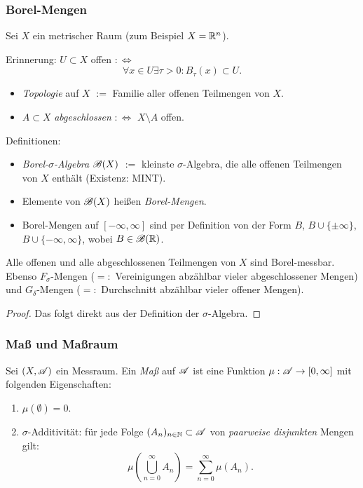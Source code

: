 \documentclass[
 a4paper,
 12pt,
 parskip=half
 ]{scrartcl}
\theoremstyle{plain}
\theoremstyle{definition}
\numberwithin{equation}{section}
\begin{document}
\subsubsection{Borel-Mengen}
Sei $X$ ein metrischer Raum (zum Beispiel $X = \mathbb{R}^n$). 

Erinnerung: $U \subset X$ offen $:\Leftrightarrow$
\[ \forall x \in U \exists \tau > 0: B_\tau(x) \subset U. \]
\begin{itemize}
 \item \emph{Topologie} auf $X$ $:=$ Familie aller offenen Teilmengen von $X$.
 \item $A \subset X$ \emph{abgeschlossen} $:\Leftrightarrow$ $X \setminus A$ offen.
\end{itemize}

Definitionen:
\begin{itemize}
 \item \emph{Borel-$\sigma$-Algebra} $\mathscr{B}(X)$ $:=$ kleinste $\sigma$-Algebra, die alle offenen Teilmengen von $X$ enthält (Existenz: MINT).
 \item Elemente von $\mathscr{B}(X)$ heißen \emph{Borel-Mengen}.
 \item Borel-Mengen auf $[-\infty,\infty]$ sind per Definition von der Form $B$, $B \cup \{ \pm \infty \}$, $B \cup \{ -\infty, \infty \}$, wobei $B \in \mathscr{B}(\mathbb{R})$.
\end{itemize}

\begin{bem}
 Alle offenen und alle abgeschlossenen Teilmengen von $X$ sind Borel-messbar. Ebenso $F_\sigma$-Mengen ($=:$ Vereinigungen abzählbar vieler abgeschlossener Mengen) und $G_\delta$-Mengen ($=:$ Durchschnitt abzählbar vieler offener Mengen).
\end{bem}

\begin{proof}
 Das folgt direkt aus der Definition der $\sigma$-Algebra.
\end{proof}

\subsubsection{Maß und Maßraum}
Sei $(X,\mathscr{A})$ ein Messraum. Ein \emph{Maß} auf $\mathscr{A}$ ist eine Funktion $\mu: \mathscr{A} \to [0,\infty]$ mit folgenden Eigenschaften:
\begin{enumerate}
 \item $\mu(\emptyset)=0$.
 \item $\sigma$-Additivität: für jede Folge $(A_n)_{n \in \mathbb{N}} \subset \mathscr{A}$ von \emph{paarweise disjunkten} Mengen gilt:
 \[ \mu\left( \bigcup_{n=0}^\infty A_n \right) = \sum_{n=0}^\infty \mu(A_n). \]
\end{enumerate}
\end{document}
